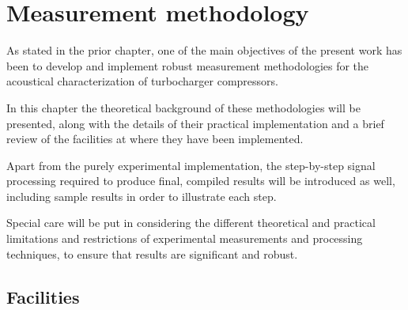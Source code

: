 \chapter{Measurement methodology} \label{cap:metod}



\noindent As stated in the prior chapter, one of the main objectives of the present work has been to develop and implement robust measurement methodologies for the acoustical characterization of turbocharger compressors.

In this chapter the theoretical background of these methodologies will be presented, along with the details of their practical implementation and a brief review of the facilities at where they have been implemented.

Apart from the purely experimental implementation, the step-by-step signal processing required to produce final, compiled results will be introduced as well, including sample results in order to illustrate each step.

Special care will be put in considering the different theoretical and practical limitations and restrictions of experimental measurements and processing techniques, to ensure that results are significant and robust.

\section{Facilities} %

